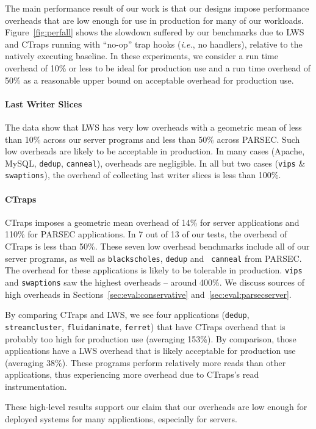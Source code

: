 \documentclass[pageno,nohyperref]{jpaper}
\newcommand{\ctraps}{CTraps\xspace}
\newcommand{\lws}{LWS\xspace}
\begin{document}
The main performance result of our work is that our designs impose performance
overheads that are low enough for use in production for many of our
workloads.  Figure~\ref{fig:perfall} shows the slowdown suffered
by our benchmarks due to \lws and \ctraps running with ``no-op''
trap hooks ({\em i.e.}, no handlers), relative to the natively executing
baseline.  In these experiments, we consider a run time overhead of 10\% or
less to be ideal for production use and a run time overhead of 50\% as
a reasonable upper bound on acceptable overhead for production use.

\paragraph{Last Writer Slices}
The data show that \lws has very low overheads with a geometric
mean of less than 10\% across our server programs and less than 50\% across
PARSEC.  Such low overheads are likely to be acceptable in production.  In many
cases (Apache, MySQL, {\tt dedup}, {\tt canneal}), overheads are negligible.
In all but two cases ({\tt vips} \& {\tt swaptions}), the overhead of
collecting last writer slices is less than 100\%.    

\paragraph{\ctraps}
\ctraps imposes a geometric mean overhead of 14\% for server applications and
110\% for PARSEC applications.  In 7 out of 13 of our tests, the overhead of
\ctraps is less than 50\%.  These seven low overhead benchmarks include all of
our server programs, as well as {\tt blackscholes}, {\tt dedup} and {\tt
canneal} from PARSEC.  The overhead for these applications is likely to be
tolerable in production.  {\tt vips} and {\tt swaptions} saw the highest
overheads -- around 400\%.  We discuss sources of high overheads in
Sections~\ref{sec:eval:conservative} and~\ref{sec:eval:parsecserver}.

By comparing \ctraps and \lws, we see four applications ({\tt dedup}, {\tt
streamcluster}, {\tt fluidanimate}, {\tt ferret}) that have \ctraps overhead
that is probably too high for production use (averaging 153\%).  By comparison,
those applications have a \lws overhead that is likely acceptable for
production use (averaging 38\%).  These programs perform relatively more reads
than other applications, thus experiencing more overhead due to \ctraps's read
instrumentation.

These high-level results support our claim that our overheads 
are low enough for deployed systems for many applications, especially
for servers.  
\end{document}
